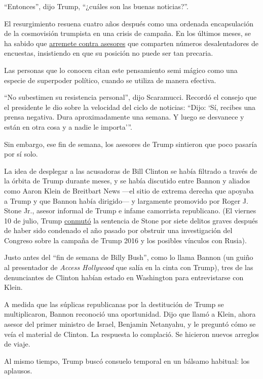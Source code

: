 ``Entonces'', dijo Trump, ``¿cuáles son las buenas noticias?''.

El resurgimiento resuena cuatro años después como una ordenada
encapsulación de la cosmovisión trumpista en una crisis de campaña. En
los últimos meses, se ha sabido que
\href{https://www.nytimes.com/2020/04/29/us/politics/trump-campaign-reelection-polls.html}{arremete
contra asesores} que comparten números desalentadores de encuestas,
insistiendo en que su posición no puede ser tan precaria.

Las personas que lo conocen citan este pensamiento semi mágico como una
especie de superpoder político, cuando se utiliza de manera efectiva.

``No subestimen su resistencia personal'', dijo Scaramucci. Recordó el
consejo que el presidente le dio sobre la velocidad del ciclo de
noticias: ``Dijo: `Sí, recibes una prensa negativa. Dura aproximadamente
una semana. Y luego se desvanece y están en otra cosa y a nadie le
importa'''.

Sin embargo, ese fin de semana, los asesores de Trump sintieron que poco
pasaría por sí solo.

La idea de desplegar a las acusadoras de Bill Clinton se había filtrado
a través de la órbita de Trump durante meses, y se había discutido entre
Bannon y aliados como Aaron Klein de Breitbart News ---el sitio de
extrema derecha que apoyaba a Trump y que Bannon había dirigido--- y
largamente promovido por Roger J. Stone Jr., asesor informal de Trump e
infame camorrista republicano. (El viernes 10 de julio, Trump
\href{https://www.nytimes.com/2020/07/10/us/politics/trump-roger-stone-clemency.html}{conmutó}
la sentencia de Stone por siete delitos graves después de haber sido
condenado el año pasado por obstruir una investigación del Congreso
sobre la campaña de Trump 2016 y los posibles vínculos con Rusia).

Justo antes del ``fin de semana de Billy Bush'', como lo llama Bannon
(un guiño al presentador de \emph{Access Hollywood} que salía en la
cinta con Trump), tres de las denunciantes de Clinton habían estado en
Washington para entrevistarse con Klein.

A medida que las súplicas republicanas por la destitución de Trump se
multiplicaron, Bannon reconoció una oportunidad. Dijo que llamó a Klein,
ahora asesor del primer ministro de Israel, Benjamin Netanyahu, y le
preguntó cómo se veía el material de Clinton. La respuesta lo complació.
Se hicieron nuevos arreglos de viaje.

Al mismo tiempo, Trump buscó consuelo temporal en un bálsamo habitual:
los aplausos.

